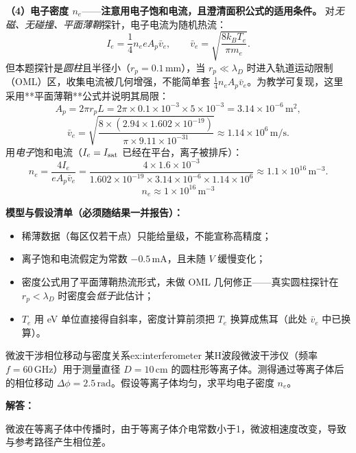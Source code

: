 \textbf{（4）电子密度 $n_e$}——\textbf{注意用电子饱和电流，且澄清面积公式的适用条件。} 对\emph{无磁、无碰撞、平面薄鞘}探针，电子电流为随机热流：
\begin{equation}
    I_e = \frac{1}{4} n_e e A_p \bar v_e,\qquad \bar v_e = \sqrt{\frac{8k_BT_e}{\pi m_e}}.
\end{equation}
但本题探针是\emph{圆柱}且半径小（$r_p=0.1\,\mathrm{mm}$），当 $r_p \ll \lambda_D$ 时进入轨道运动限制（OML）区，收集电流被几何增强，不能简单套 $\frac14 n_eA_p\bar v_e$。为教学可复现，这里采用**平面薄鞘**公式并说明其局限：
\[
    A_p = 2\pi r_p L = 2\pi\times0.1\times10^{-3}\times5\times10^{-3} = 3.14\times10^{-6}\,\mathrm{m^2},
\]
\[
    \bar v_e = \sqrt{\frac{8\times(2.94\times1.602\times10^{-19})}{\pi\times9.11\times10^{-31}}}
    \approx 1.14\times10^{6}\,\mathrm{m/s}.
\]
用\emph{电子}饱和电流（$I_e = I_{\rm sat}$ 已经在平台，离子被排斥）：
\begin{equation}
    n_e = \frac{4 I_e}{eA_p\bar v_e}
    = \frac{4\times1.6\times10^{-3}}{1.602\times10^{-19}\times3.14\times10^{-6}\times1.14\times10^{6}}
    \approx 1.1\times10^{16}\,\mathrm{m^{-3}}.
\end{equation}
\[
    \boxed{n_e \approx 1\times10^{16}\,\mathrm{m^{-3}}}
\]

\textbf{模型与假设清单（必须随结果一并报告）：}
\begin{itemize}
    \item 稀薄数据（每区仅若干点）只能给量级，不能宣称高精度；
    \item 离子饱和电流假定为常数 $-0.5\,\mathrm{mA}$，且未随 $V$ 缓慢变化；
    \item 密度公式用了平面薄鞘热流形式，未做 OML 几何修正——真实圆柱探针在 $r_p<\lambda_D$ 时密度会\emph{低于}此估计；
    \item $T_e$ 用 eV 单位直接得自斜率，密度计算前须把 $T_e$ 换算成焦耳（此处 $\bar v_e$ 中已换算）。
\end{itemize}



\begin{example}{微波干涉相位移动与密度关系}{ex:interferometer}
某H波段微波干涉仪（频率 $f=60\,\mathrm{GHz}$）用于测量直径 $D=10\,\mathrm{cm}$ 的圆柱形等离子体。测得通过等离子体后的相位移动 $\Delta\phi = 2.5\,\mathrm{rad}$。假设等离子体均匀，求平均电子密度 $n_e$。
\end{example}

\textbf{解答：}

微波在等离子体中传播时，由于等离子体介电常数小于1，微波相速度改变，导致与参考路径产生相位差。

